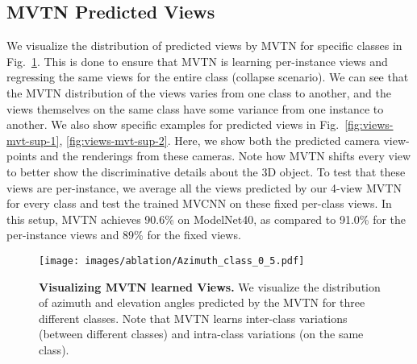 \documentclass[10pt,twocolumn,letterpaper]{article}
\newcommand{\figLabel}{Fig.~}
\begin{document}
\subsection{MVTN Predicted Views}
We visualize the distribution of predicted views by MVTN for specific classes in \figLabel{\ref{fig:distribution-sup}}. This is done to ensure that MVTN is learning per-instance views and regressing the same views for the entire class (collapse scenario). We can see that the MVTN distribution of the views varies from one class to another, and the views themselves on the same class have some variance from one instance to another. We also show specific examples for predicted views in \figLabel{\ref{fig:views-mvt-sup-1}, \ref{fig:views-mvt-sup-2}}. Here, we show both the predicted camera view-points and the renderings from these cameras. Note how MVTN shifts every view to better show the discriminative details about the 3D object.
To test that these views are per-instance, we average all the views predicted by our 4-view MVTN for every class and test the trained MVCNN on these fixed per-class views. In this setup, MVTN achieves 90.6\% on ModelNet40, as compared to 91.0\% for the per-instance views and 89\% for the fixed views. 
\begin{figure}[t]
    \centering
        \texttt{[image: images/ablation/Azimuth\_class\_0\_5.pdf]}
    \caption{\textbf{Visualizing MVTN learned Views.} We visualize the distribution of azimuth and elevation angles predicted by the MVTN for three different classes. Note that MVTN learns inter-class variations (between different classes) and intra-class variations (on the same class).}
    \label{fig:distribution-sup}
\end{figure}
\end{document}
